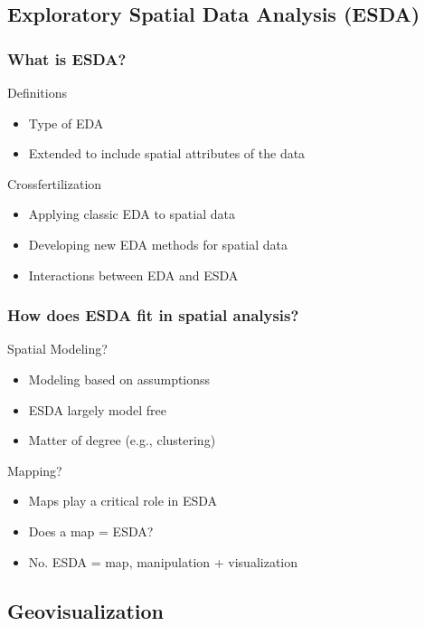 \documentclass[nototal,handout]{beamer}
\begin{document}
\subsection{Exploratory Spatial Data Analysis (ESDA)} 

\begin{frame}
	\frametitle{What is ESDA?}
 
\begin{block}{Definitions}
 \begin{itemize}
 \item  Type of EDA
 \item  Extended to include spatial attributes of the data
 \end{itemize}
 \end{block} 
\begin{block}{Crossfertilization}
 \begin{itemize}
 \item  Applying classic EDA to spatial data
 \item  Developing new EDA methods for spatial data
 \item  Interactions between EDA and ESDA
 \end{itemize}
 \end{block} \end{frame} 

\begin{frame}
	\frametitle{How does ESDA fit in spatial analysis?}
 
\begin{block}{Spatial Modeling?}
 \begin{itemize}
 \item  Modeling based on assumptionss
 \item  ESDA largely model free
 \item  Matter of degree (e.g., clustering)
 \end{itemize}
 \end{block} 
\begin{block}{Mapping?}
 \begin{itemize}
 \item  Maps play a critical role in ESDA
 \item  Does a map = ESDA?
 \item  No. ESDA = map, manipulation + visualization
 \end{itemize}
 \end{block} \end{frame} 

\subsection{Geovisualization} 
\end{document}
